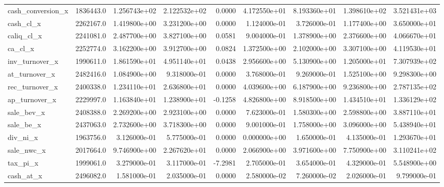 \documentclass[10pt]{article}
\begin{document}
\begin{landscape}
\begin{longtable}{|l|r|r|r|r|r|r|r|r|}
cash\_conversion\_x       &  1836443.0 &  1.256743e+02 &  2.122532e+02 &      0.0000 &  4.172550e+01 &  8.193360e+01 &  1.398610e+02 &  3.521431e+03 \\
cash\_cl\_x               &  2262167.0 &  1.419800e+00 &  3.231200e+00 &      0.0000 &  1.124000e-01 &  3.726000e-01 &  1.177400e+00 &  3.650000e+01 \\
caliq\_cl\_x              &  2241081.0 &  2.487700e+00 &  3.827100e+00 &      0.0581 &  9.004000e-01 &  1.378900e+00 &  2.376600e+00 &  4.066670e+01 \\
ca\_cl\_x                 &  2252774.0 &  3.162200e+00 &  3.912700e+00 &      0.0824 &  1.372500e+00 &  2.102000e+00 &  3.307100e+00 &  4.119530e+01 \\
inv\_turnover\_x          &  1990611.0 &  1.861590e+01 &  4.951140e+01 &      0.0438 &  2.956600e+00 &  5.130900e+00 &  1.205000e+01 &  7.307939e+02 \\
at\_turnover\_x           &  2482416.0 &  1.084900e+00 &  9.318000e-01 &      0.0000 &  3.768000e-01 &  9.269000e-01 &  1.525100e+00 &  9.298300e+00 \\
rec\_turnover\_x          &  2400338.0 &  1.234110e+01 &  2.636800e+01 &      0.0000 &  4.039600e+00 &  6.187900e+00 &  9.236800e+00 &  2.787135e+02 \\
ap\_turnover\_x           &  2229997.0 &  1.163840e+01 &  1.238900e+01 &     -0.1258 &  4.826800e+00 &  8.918500e+00 &  1.434510e+01 &  1.336129e+02 \\
sale\_bev\_x              &  2408388.0 &  2.269200e+00 &  2.923100e+00 &      0.0000 &  7.623000e-01 &  1.580300e+00 &  2.598800e+00 &  3.887110e+01 \\
sale\_be\_x               &  2437063.0 &  2.732600e+00 &  3.718300e+00 &      0.0000 &  9.001000e-01 &  1.758000e+00 &  3.096000e+00 &  5.438940e+01 \\
div\_ni\_x                &  1963756.0 &  3.126000e-01 &  5.775000e-01 &      0.0000 &  0.000000e+00 &  1.650000e-01 &  4.135000e-01 &  1.293670e+01 \\
sale\_nwc\_x              &  2017664.0 &  9.746900e+00 &  2.267620e+01 &      0.0000 &  2.066900e+00 &  3.971600e+00 &  7.750900e+00 &  3.110241e+02 \\
tax\_pi\_x                &  1999061.0 &  3.279000e-01 &  3.117000e-01 &     -7.2981 &  2.705000e-01 &  3.654000e-01 &  4.329000e-01 &  5.548900e+00 \\
cash\_at\_x               &  2496082.0 &  1.581000e-01 &  2.035000e-01 &      0.0000 &  2.580000e-02 &  7.260000e-02 &  2.026000e-01 &  9.799000e-01 \\

\end{longtable}
\end{landscape}
\end{document}
